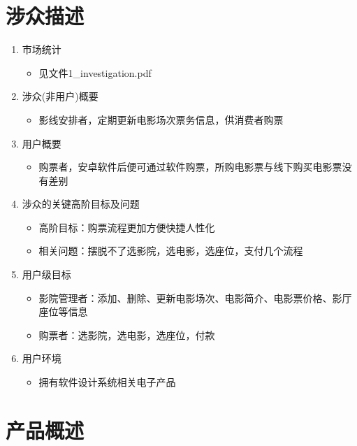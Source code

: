 \documentclass[a4paper]{article}
\begin{document}
\section{涉众描述}
\begin{enumerate}[resume]
  \item 市场统计
  \begin{itemize}
    \item 见文件1\_investigation.pdf
  \end{itemize}
  \item 涉众(非用户)概要
  \begin{itemize}
    \item 影线安排者，定期更新电影场次票务信息，供消费者购票
  \end{itemize}
  \item 用户概要
  \begin{itemize}
    \item 购票者，安卓软件后便可通过软件购票，所购电影票与线下购买电影票没有差别
  \end{itemize}
  \item 涉众的关键高阶目标及问题
  \begin{itemize}
    \item 高阶目标：购票流程更加方便快捷人性化
    \item 相关问题：摆脱不了选影院，选电影，选座位，支付几个流程
  \end{itemize}
  \item 用户级目标
  \begin{itemize}
    \item 影院管理者：添加、删除、更新电影场次、电影简介、电影票价格、影厅座位等信息
    \item 购票者：选影院，选电影，选座位，付款
  \end{itemize}
  \item 用户环境
  \begin{itemize}
    \item 拥有软件设计系统相关电子产品
  \end{itemize}
\end{enumerate}

\section{产品概述}
\end{document}
